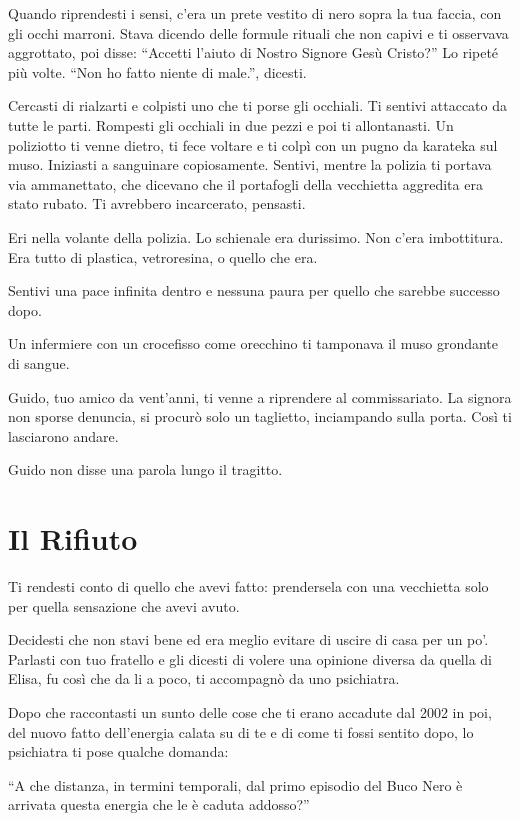 Quando riprendesti i sensi, c'era un prete vestito di nero sopra la tua faccia, con gli occhi marroni. Stava dicendo delle formule rituali che non capivi e ti osservava aggrottato, poi disse: “Accetti l'aiuto di Nostro Signore Gesù Cristo?” Lo ripeté più volte. “Non ho fatto niente di male.”, dicesti.

Cercasti di rialzarti e colpisti uno che ti porse gli occhiali. Ti sentivi attaccato da tutte le parti. Rompesti gli occhiali in due pezzi e poi ti allontanasti. Un poliziotto ti venne dietro, ti fece voltare e ti colpì con un pugno da karateka sul muso. Iniziasti a sanguinare copiosamente. Sentivi, mentre la polizia ti portava via ammanettato, che dicevano che il portafogli della vecchietta aggredita era stato rubato. Ti avrebbero incarcerato, pensasti.

Eri nella volante della polizia. Lo schienale era durissimo. Non c'era imbottitura. Era tutto di plastica, vetroresina, o quello che era.

Sentivi una pace infinita dentro e nessuna paura per quello che sarebbe successo dopo.

Un infermiere con un crocefisso come orecchino ti tamponava il muso grondante di sangue.

Guido, tuo amico da vent'anni, ti venne a riprendere al commissariato. La signora non sporse denuncia, si procurò solo un taglietto, inciampando sulla porta. Così ti lasciarono andare.

Guido non disse una parola lungo il tragitto.

\section{Il Rifiuto}
\label{il_rifiuto}

Ti rendesti conto di quello che avevi fatto: prendersela con una vecchietta solo per quella sensazione che avevi avuto.

Decidesti che non stavi bene ed era meglio evitare di uscire di casa per un po'. Parlasti con tuo fratello e gli dicesti di volere una opinione diversa da quella di Elisa, fu così che da li a poco, ti accompagnò da uno psichiatra.

Dopo che raccontasti un sunto delle cose che ti erano accadute dal 2002 in poi, del nuovo fatto dell'energia calata su di te e di come ti fossi sentito dopo, lo psichiatra ti pose qualche domanda:

“A che distanza, in termini temporali, dal primo episodio del Buco Nero è arrivata questa energia che le è caduta addosso?”

